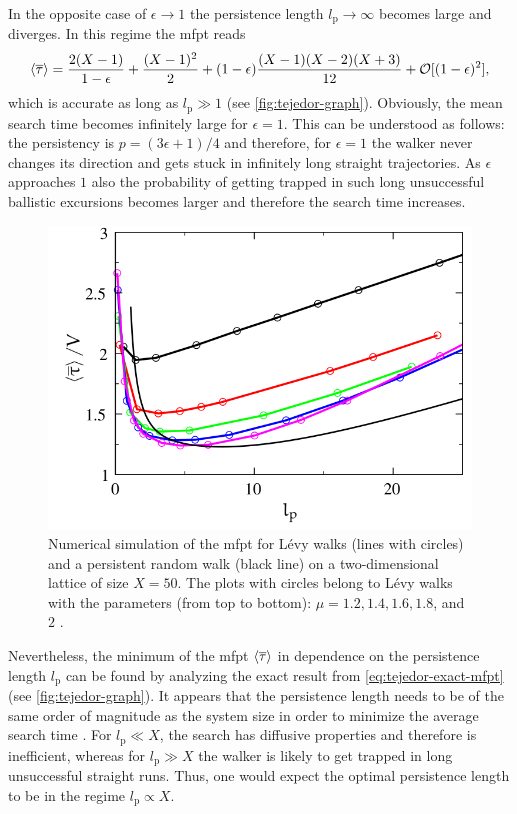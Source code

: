 In the opposite case of $\epsilon \rightarrow 1$ the persistence length $l_\textrm{p} \rightarrow \infty$ becomes large and diverges. In this regime the \ac{mfpt} reads \cite{tejedor:2012}
\begin{equation*}
 \mfpt[\mean{\tau}] = \frac{2(X-1)}{1-\epsilon} + \frac{(X-1)^2}{2} + (1-\epsilon)\frac{(X-1)(X-2)(X+3)}{12} + \mathcal{O}[(1-\epsilon)^2],
\end{equation*}
which is accurate as long as $l_\textrm{p} \gg 1$ (see \autoref{fig:tejedor-graph}). Obviously, the mean search time becomes infinitely large for $\epsilon = 1$. This can be understood as follows: the persistency is $p = (3\epsilon + 1) / 4$ and therefore, for $\epsilon = 1$ the walker never changes its direction and gets stuck in infinitely long straight trajectories. As $\epsilon$ approaches $1$ also the probability of getting trapped in such long unsuccessful ballistic excursions becomes larger and therefore the search time increases.

\begin{figure}[bth]
 \myfloatalign
 \includegraphics[width=0.8\linewidth]{gfx/tejedor-levy}
 \caption[]{Numerical simulation of the \ac{mfpt} for Lévy walks (lines with circles) and a persistent random walk (black line) on a two-dimensional lattice of size $X=50$. The plots with circles belong to Lévy walks with the parameters (from top to bottom): $\mu = 1.2, 1.4, 1.6, 1.8$, and $2$ \cite{tejedor:2012}.}\label{fig:tejedor-levy}
\end{figure}

Nevertheless, the minimum of the \ac{mfpt} $\mfpt[\mean{\tau}]$ in dependence on the persistence length $l_\textrm{p}$ can be found by analyzing the exact result from \autoref{eq:tejedor-exact-mfpt} (see \autoref{fig:tejedor-graph}). It appears that the persistence length needs to be of the same order of magnitude as the system size in order to minimize the average search time \cite{tejedor:2012}. For $l_\textrm{p} \ll X$, the search has diffusive properties and therefore is inefficient, whereas for $l_\textrm{p} \gg X$ the walker is likely to get trapped in long unsuccessful straight runs. Thus, one would expect the optimal persistence length to be in the regime $l_\textrm{p} \propto X$.

